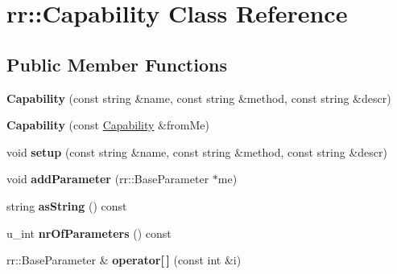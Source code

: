 \hypertarget{classrr_1_1_capability}{\section{rr\-:\-:Capability Class Reference}
\label{classrr_1_1_capability}
}
\subsection*{Public Member Functions}
\begin{DoxyCompactItemize}
\item 
\hypertarget{classrr_1_1_capability_a6dd2ecd0cc99570ac64c5eb36cafd800}{{\bfseries Capability} (const string \&name, const string \&method, const string \&descr)}\label{classrr_1_1_capability_a6dd2ecd0cc99570ac64c5eb36cafd800}

\item 
\hypertarget{classrr_1_1_capability_a3a64cdc600bdcc2cc0c86cb74901bb9b}{{\bfseries Capability} (const \hyperlink{classrr_1_1_capability}{Capability} \&from\-Me)}\label{classrr_1_1_capability_a3a64cdc600bdcc2cc0c86cb74901bb9b}

\item 
\hypertarget{classrr_1_1_capability_a565f58ce482b8fb3686259d253b39a45}{void {\bfseries setup} (const string \&name, const string \&method, const string \&descr)}\label{classrr_1_1_capability_a565f58ce482b8fb3686259d253b39a45}

\item 
\hypertarget{classrr_1_1_capability_ad13f85748e253ef4fd5ab9737de344d7}{void {\bfseries add\-Parameter} (rr\-::\-Base\-Parameter $\ast$me)}\label{classrr_1_1_capability_ad13f85748e253ef4fd5ab9737de344d7}

\item 
\hypertarget{classrr_1_1_capability_a475a26eb71b73ffb90f2affa12512551}{string {\bfseries as\-String} () const }\label{classrr_1_1_capability_a475a26eb71b73ffb90f2affa12512551}

\item 
\hypertarget{classrr_1_1_capability_af99b4730a4f392a196eec78b17ecebc0}{u\-\_\-int {\bfseries nr\-Of\-Parameters} () const }\label{classrr_1_1_capability_af99b4730a4f392a196eec78b17ecebc0}

\item 
\hypertarget{classrr_1_1_capability_a4184cf1d41255d29be740fa61a87203a}{rr\-::\-Base\-Parameter \& {\bfseries operator\mbox{[}$\,$\mbox{]}} (const int \&i)}\label{classrr_1_1_capability_a4184cf1d41255d29be740fa61a87203a}


\end{DoxyCompactItemize}
